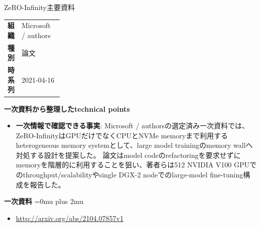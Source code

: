 \begin{technicalnote}{ZeRO-Infinity}{主要資料}
\begingroup
\begin{tabularx}{\linewidth}{@{}>{\bfseries}p{0.22\linewidth}X@{}}
組織 & Microsoft / authors \\
種別 & 論文 \\
時系列 & 2021-04-16 \\
\end{tabularx}
\smallskip
\begin{minipage}{\linewidth}
{\bfseries 一次資料から整理したtechnical points}
\begin{itemize}[leftmargin=1.5em,itemsep=0.35em]
\item \textbf{一次情報で確認できる事実}: Microsoft / authorsの選定済み一次資料では、ZeRO-InfinityはGPUだけでなくCPUとNVMe memoryまで利用するheterogeneous memory systemとして、large model trainingのmemory wallへ対処する設計を提案した。 論文はmodel codeのrefactoringを要求せずにmemoryを階層的に利用することを狙い、著者らは512 NVIDIA V100 GPUでのthroughput/scalabilityやsingle DGX-2 nodeでのlarge-model fine-tuning構成を報告した。
\end{itemize}
\begin{minipage}{\linewidth}
\begin{samepage}
{\bfseries 一次資料}
\begingroup\sloppy
\Urlmuskip=0mu plus 2mu\relax
\begin{itemize}[leftmargin=1.5em,itemsep=0.25em]
\item {\scriptsize\url{http://arxiv.org/abs/2104.07857v1}}
\end{itemize}
\endgroup
\end{samepage}
\end{minipage}
\end{minipage}
\endgroup
\end{technicalnote}
\medskip

